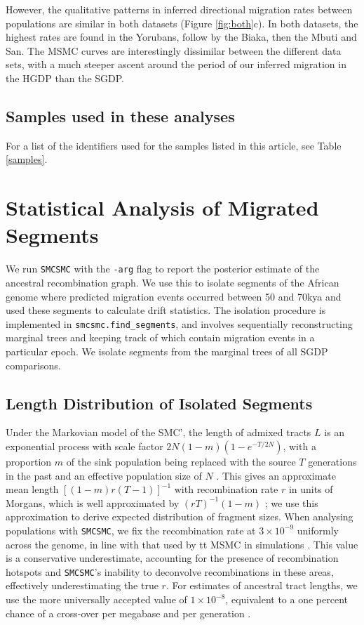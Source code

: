 \documentclass{article}
\begin{document}
However, the qualitative patterns in inferred directional migration rates between populations are similar in both datasets (Figure \ref{fig:both}c). In both datasets, the highest rates are found in the Yorubans, follow by the Biaka, then the Mbuti and San. The MSMC curves are interestingly dissimilar between the different data sets, with a much steeper ascent around the period of our inferred migration in the HGDP than the SGDP. 


\subsection{Samples used in these analyses}

For a list of the identifiers used for the samples listed in this article, see Table \ref{samples}.

\section{Statistical Analysis of Migrated Segments} \label{dstats_section}

We run {\tt SMCSMC} with the {\tt -arg} flag to report the posterior estimate of the ancestral recombination graph. We use this to isolate segments of the African genome where predicted migration events occurred between 50 and 70kya and used these segments to calculate drift statistics. The isolation procedure is implemented in {\tt smcsmc.find\_segments}, and involves sequentially reconstructing marginal trees and keeping track of which contain migration events in a particular epoch. We isolate segments from the marginal trees of all SGDP comparisons. 

\subsection{Length Distribution of Isolated Segments}


 Under the Markovian model of the SMC', the length of admixed tracts $L$ is an exponential process with scale factor $2N (1 - m ) \left( 1 - e^{-T / 2N} \right)$, with a proportion $m$ of the sink population being replaced with the source $T$ generations in the past and an effective population size of $N$ \cite{Marjoram2006,Liang953}. This gives an approximate mean length $\left[ (1 -m)r(T-1) \right]^{-1}$ with recombination rate $r$ in units of Morgans, which is well approximated
by  $(rT)^{-1}(1-m)$ \cite{Racimo2015}; we use this approximation to derive expected distribution of fragment sizes. When analysing populations with {\tt SMCSMC}, we fix the recombination rate at $3 \times 10^{-9}$ uniformly across the genome, in line with that used by {tt MSMC} in simulations \cite[Supp.\ section 7]{Schiffels2014a}.
This value is a conservative underestimate, accounting for the presence of recombination hotspots and {\tt SMCSMC}'s inability to deconvolve recombinations in these areas, effectively underestimating the true $r$.  For estimates of ancestral tract lengths, we use the more universally accepted value of $1 \times 10^{-8}$, equivalent to a one percent chance of a cross-over per megabase and per generation \cite{Dumont2008}. 
\end{document}
